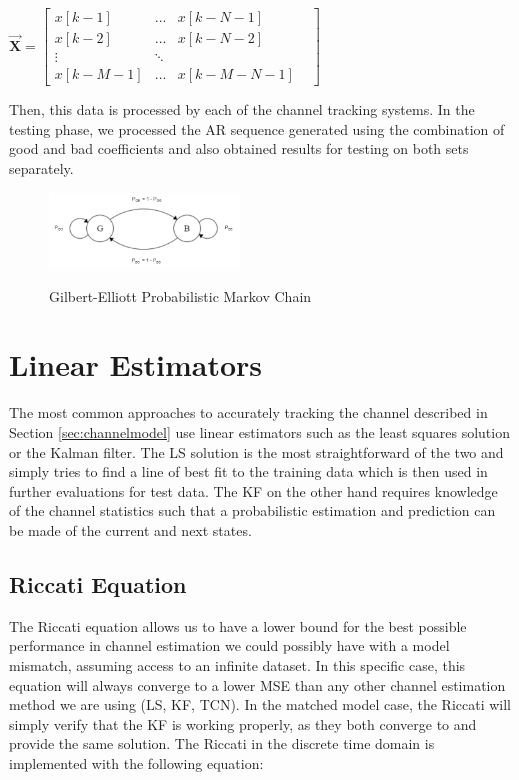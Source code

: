\documentclass[twocolumn,letterpaper]{IEEEAerospaceCLS}  %
\begin{document}
$\vec{\textbf{X}} = \begin{bmatrix}
x[k-1]   & ...       & x[k-N-1]     & \\
x[k-2]   & ...       & x[k-N-2]     & \\
\vdots             &  \ddots   &              & \\
x[k-M-1] & ...       & x[k-M-N-1]  
\end{bmatrix}$

Then, this data is processed by each of the channel tracking systems. In the testing phase, we processed the AR sequence generated using the combination of good and bad coefficients and also obtained results for testing on both sets separately. 


\begin{figure}[!h]
\centering\includegraphics[width=0.45\textwidth]{figs/GBmodel.PNG}\\
\caption{Gilbert-Elliott Probabilistic Markov Chain}
\label{gbe}
\end{figure}

\section{Linear Estimators}
\label{sec:linest}

The most common approaches to accurately tracking the channel described in Section \ref{sec:channelmodel} use linear estimators such as the least squares solution or the Kalman filter. The LS solution is the most straightforward of the two and simply tries to find a line of best fit to the training data which is then used in further evaluations for test data. The KF on the other hand requires knowledge of the channel statistics such that a probabilistic estimation and prediction can be made of the current and next states. 

\subsection{Riccati Equation}

The Riccati equation allows us to have a lower bound for the best possible performance in channel estimation we could possibly have with a model mismatch, assuming access to an infinite dataset. In this specific case, this equation will always converge to a lower MSE than any other channel estimation method we are using (LS, KF, TCN). In the matched model case, the Riccati will simply verify that the KF is working properly, as they both converge to and provide the same solution. The Riccati in the discrete time domain is implemented with the following equation: 
\end{document}

